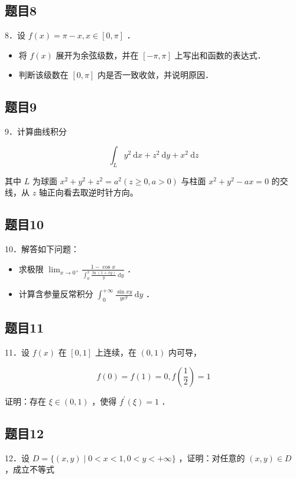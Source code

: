 \documentclass{article}
\begin{document}
\subsection{题目8}
8．设 \(f(x)=\pi-x, x \in[0, \pi]\) ．

\begin{itemize}
  \item[（1）] 将 \(f(x)\) 展开为余弦级数，并在 \([-\pi, \pi]\) 上写出和函数的表达式．
  \item[（2）] 判断该级数在 \([0, \pi]\) 内是否一致收敛，并说明原因．
\end{itemize}

\subsection{题目9}
9．计算曲线积分

\[
\int_{L} y^{2} \mathrm{~d} x+z^{2} \mathrm{~d} y+x^{2} \mathrm{~d} z
\]

其中 \(L\) 为球面 \(x^{2}+y^{2}+z^{2}=a^{2}(z \geq 0, a>0)\) 与柱面 \(x^{2}+y^{2}-a x=0\) 的交线，从 \(z\) 轴正向看去取逆时针方向。

\subsection{题目10}
10．解答如下问题：

\begin{itemize}
  \item[（1）] 求极限 \(\lim _{x \rightarrow 0^{+}} \frac{1-\cos x}{\int_{0}^{x} \frac{\ln (1+x y)}{y} \mathrm{~d} y}\) ．
  \item[（2）] 计算含参量反常积分 \(\int_{0}^{+\infty} \frac{\sin x y}{y e^{y}} \mathrm{~d} y\) ．
\end{itemize}

\subsection{题目11}
11．设 \(f(x)\) 在 \([0,1]\) 上连续，在 \((0,1)\) 内可导，

\[
f(0)=f(1)=0, f\left(\frac{1}{2}\right)=1
\]

证明：存在 \(\xi \in(0,1)\) ，使得 \(f^{\prime}(\xi)=1\) ．

\subsection{题目12}
12．设 \(D=\{(x, y) \mid 0<x<1,0<y<+\infty\}\) ，证明：对任意的 \((x, y) \in D\) ，成立不等式
\end{document}
